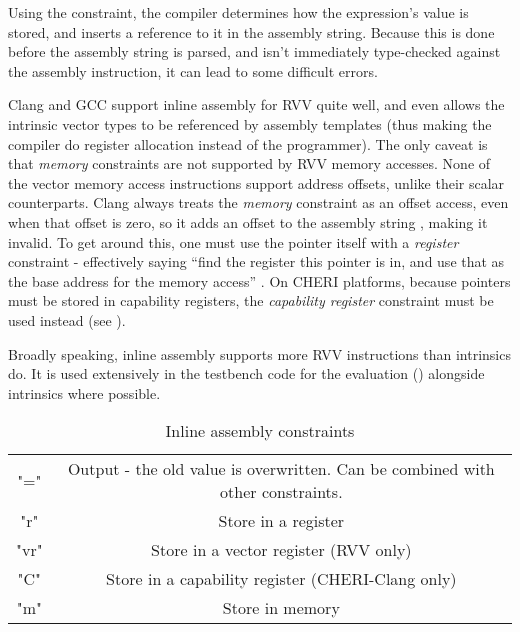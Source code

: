 Using the constraint, the compiler determines how the expression's value is stored, and inserts a reference to it in the assembly string.
Because this is done before the assembly string is parsed, and isn't immediately type-checked against the assembly instruction, it can lead to some difficult errors.

Clang and GCC support inline assembly for RVV quite well, and even allows the intrinsic vector types to be referenced by assembly templates (thus making the compiler do register allocation instead of the programmer).
The only caveat is that \emph{memory} constraints are not supported by RVV memory accesses.
None of the vector memory access instructions support address offsets, unlike their scalar counterparts.
Clang always treats the \emph{memory} constraint as an offset access, even when that offset is zero, so it adds an offset to the assembly string , making it invalid.
To get around this, one must use the pointer itself with a \emph{register} constraint - effectively saying \enquote{find the register this pointer is in, and use that as the base address for the memory access} .
On CHERI platforms, because pointers must be stored in capability registers, the \emph{capability register} constraint must be used instead (see ).

Broadly speaking, inline assembly supports more RVV instructions than intrinsics do.
It is used extensively in the testbench code for the evaluation () alongside intrinsics where possible.


\begin{table}[]
    \centering
    \begin{tabular}{c|c}
       "="  & Output - the old value is overwritten. Can be combined with other constraints. \\
        "r" & Store in a register \\
        "vr" & Store in a vector register (RVV only) \\
        "C" & Store in a capability register (CHERI-Clang only) \\
        "m" & Store in memory \\
    \end{tabular}
    \caption{Inline assembly constraints }
    \label{tab:inline_asm_constraints}
\end{table}

